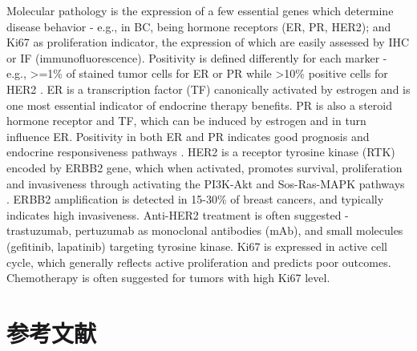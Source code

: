 Molecular pathology is the expression of a few essential genes which determine disease behavior - e.g., in BC, being hormone receptors (ER, PR, HER2); and Ki67 as proliferation indicator, the expression of which are easily assessed by IHC or IF (immunofluorescence). Positivity is defined differently for each marker - e.g., >=1\% of stained tumor cells for ER or PR while >10\% positive cells for HER2 \citep{fragomeni2018molecular}. ER is a transcription factor (TF) canonically activated by estrogen and is one most essential indicator of endocrine therapy benefits. PR is also a steroid hormone receptor and TF, which can be induced by estrogen and in turn influence ER. Positivity in both ER and PR indicates good prognosis and endocrine responsiveness pathways \citep{lange2008challenges}. HER2 is a receptor tyrosine kinase (RTK) encoded by ERBB2 gene, which when activated, promotes survival, proliferation and invasiveness through activating the PI3K-Akt and Sos-Ras-MAPK pathways \citep{hudis2007trastuzumab}. ERBB2 amplification is detected in 15-30\% of breast cancers, and typically indicates high invasiveness. Anti-HER2 treatment is often suggested - trastuzumab, pertuzumab as monoclonal antibodies (mAb), and small molecules (gefitinib, lapatinib) targeting tyrosine kinase. Ki67 is expressed in active cell cycle, which generally reflects active proliferation and predicts poor outcomes. Chemotherapy is often suggested for tumors with high Ki67 level.

\section*{参考文献}
{\renewcommand{\bibsection}{}
\putbib
}

